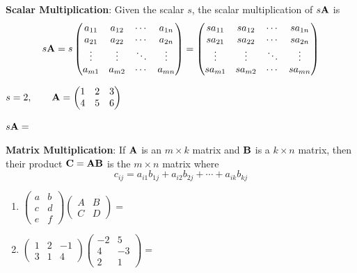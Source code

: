 \documentclass[]{book}
\theoremstyle{definition}
\theoremstyle{definition}
\theoremstyle{definition}
\theoremstyle{remark}
\let\BeginKnitrBlock\begin \let\EndKnitrBlock\end
\begin{document}
\textbf{Scalar Multiplication}: Given the scalar \(s\), the scalar multiplication of \(s {\bf A}\) is
\[ s {\bf A}=  s \begin{pmatrix}
            a_{11} & a_{12} & \cdots & a_{1n} \\
            a_{21} & a_{22} & \cdots & a_{2n} \\
            \vdots & \vdots & \ddots & \vdots \\
            a_{m1} & a_{m2} & \cdots & a_{mn}
        \end{pmatrix}
        = \begin{pmatrix}
            s a_{11} & s a_{12} & \cdots & s a_{1n} \\
            s a_{21} & s a_{22} & \cdots & s a_{2n} \\
            \vdots & \vdots & \ddots & \vdots \\
            s a_{m1} & s a_{m2} & \cdots & s a_{mn}
        \end{pmatrix}\]

\BeginKnitrBlock{example}
\protect\hypertarget{exm:scalarmulti}{}{\label{exm:scalarmulti} }

\(s=2, \qquad {\bf A}=\begin{pmatrix} 1 & 2 & 3 \\ 4 & 5 & 6 \end{pmatrix}\)

\(s {\bf A} =\)
\EndKnitrBlock{example}

\textbf{Matrix Multiplication}: If \({\bf A}\) is an \(m\times k\) matrix and \(\bf B\) is a \(k\times n\) matrix, then their product \(\bf C = A B\) is the \(m\times n\) matrix where
\[c_{ij}=a_{i1}b_{1j}+a_{i2}b_{2j}+\cdots+a_{ik}b_{kj}\]

\BeginKnitrBlock{example}
\protect\hypertarget{exm:matrixmulti}{}{\label{exm:matrixmulti} }

\begin{enumerate}
\def\labelenumi{\arabic{enumi}.}
\item
  \(\begin{pmatrix} a&b\\c&d\\e&f \end{pmatrix} \begin{pmatrix} A&B\\C&D \end{pmatrix}  =\)
\item
  \(\begin{pmatrix} 1&2&-1\\3&1&4 \end{pmatrix} \begin{pmatrix} -2&5\\4&-3\\2&1\end{pmatrix} =\)
\end{enumerate}
\EndKnitrBlock{example}
\end{document}
